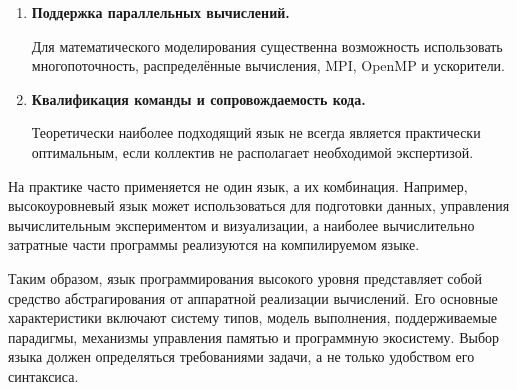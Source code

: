 \begin{enumerate}
	Для крупных научных комплексов важна возможность использовать уже
	существующий код, написанный на других языках.
	
	\item \textbf{Поддержка параллельных вычислений.}
	
	Для математического моделирования существенна возможность использовать
	многопоточность, распределённые вычисления, MPI, OpenMP и ускорители.
	
	\item \textbf{Квалификация команды и сопровождаемость кода.}
	
	Теоретически наиболее подходящий язык не всегда является практически
	оптимальным, если коллектив не располагает необходимой экспертизой.
\end{enumerate}

На практике часто применяется не один язык, а их комбинация. Например,
высокоуровневый язык может использоваться для подготовки данных, управления
вычислительным экспериментом и визуализации, а наиболее вычислительно
затратные части программы реализуются на компилируемом языке.

Таким образом, язык программирования высокого уровня представляет собой
средство абстрагирования от аппаратной реализации вычислений. Его основные
характеристики включают систему типов, модель выполнения, поддерживаемые
парадигмы, механизмы управления памятью и программную экосистему. Выбор языка
должен определяться требованиями задачи, а не только удобством его синтаксиса.

\newpage